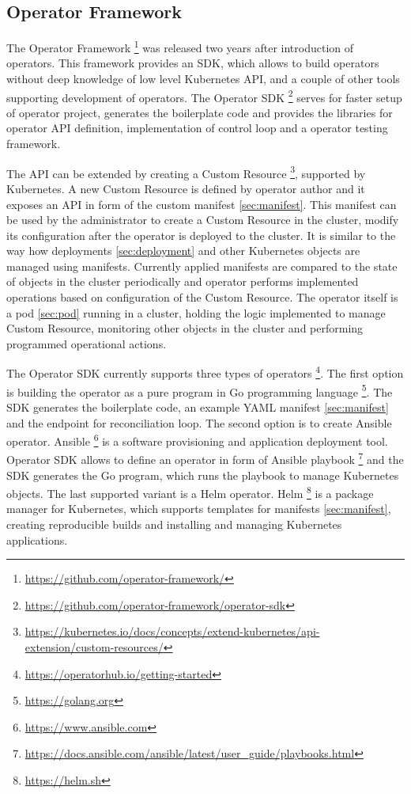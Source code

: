\documentclass[
  digital, %
  twoside, %
  table,   %
  lof,     %
  lot,     %
]{fithesis3}
\begin{document}
\subsection{Operator Framework} \label{sec:operator_framework}
The Operator Framework \footnote{\url{https://github.com/operator-framework/}} was released two years after introduction of operators. This framework provides an SDK, which allows to build operators without deep knowledge of low level Kubernetes API, and a couple of other tools supporting development of operators. The Operator SDK \footnote{\url{https://github.com/operator-framework/operator-sdk}} serves for faster setup of operator project, generates the boilerplate code and provides the libraries for operator API definition, implementation of control loop and a operator testing framework.

The API can be extended by creating a Custom Resource \footnote{\url{https://kubernetes.io/docs/concepts/extend-kubernetes/api-extension/custom-resources/}}, supported by Kubernetes. A new Custom Resource is defined by operator author and it exposes an API in form of the custom manifest \ref{sec:manifest}. This manifest can be used by the administrator to create a Custom Resource in the cluster, modify its configuration after the operator is deployed to the cluster. It is similar to the way how deployments \ref{sec:deployment} and other Kubernetes objects are managed using manifests. Currently applied manifests are compared to the state of objects in the cluster periodically and operator performs implemented operations based on configuration of the Custom Resource. The operator itself is a pod \ref{sec:pod} running in a cluster, holding the logic implemented to manage Custom Resource, monitoring other objects in the cluster and performing programmed operational actions.

The Operator SDK currently supports three types of operators \footnote{\url{https://operatorhub.io/getting-started}}. The first option is building the operator as a pure program in Go programming language \footnote{\url{https://golang.org}}. The SDK generates the boilerplate code, an example YAML manifest \ref{sec:manifest} and the endpoint for reconciliation loop. The second option is to create Ansible operator. Ansible \footnote{\url{https://www.ansible.com}} is a software provisioning and application deployment tool. Operator SDK allows to define an operator in form of Ansible playbook \footnote{\url{https://docs.ansible.com/ansible/latest/user_guide/playbooks.html}} and the SDK generates the Go program, which runs the playbook to manage Kubernetes objects. The last supported variant is a Helm operator. Helm \footnote{\url{https://helm.sh}} is a package manager for Kubernetes, which supports templates for manifests \ref{sec:manifest}, creating reproducible builds and installing and managing Kubernetes applications.  
\end{document}
